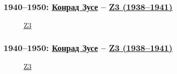 \documentclass[ignorenonframetext, hyperref=unicode]{beamer}
\begin{document}
\begin{frame}
\frametitle{1940--1950: 
\href{http://en.wikipedia.org/wiki/Konrad_Zuse}{Конрад Зусе} -- 
\href{http://irb.cs.tu-berlin.de/~zuse/Konrad_Zuse/en/Rechner_Z3.html}{Z3 (1938--1941)}}
\begin{figure}[h]
\center
{}
\caption{\href{http://en.wikipedia.org/wiki/Z3}{Z3}}
\end{figure}
\end{frame}

\begin{frame}
\frametitle{1940--1950: 
\href{http://en.wikipedia.org/wiki/Konrad_Zuse}{Конрад Зусе} -- 
\href{http://irb.cs.tu-berlin.de/~zuse/Konrad_Zuse/en/Rechner_Z3.html}{Z3 (1938--1941)}}
\begin{figure}[h]
\center
{}
\caption{\href{http://en.wikipedia.org/wiki/Z3}{Z3}}
\end{figure}
\end{frame}
\end{document}
